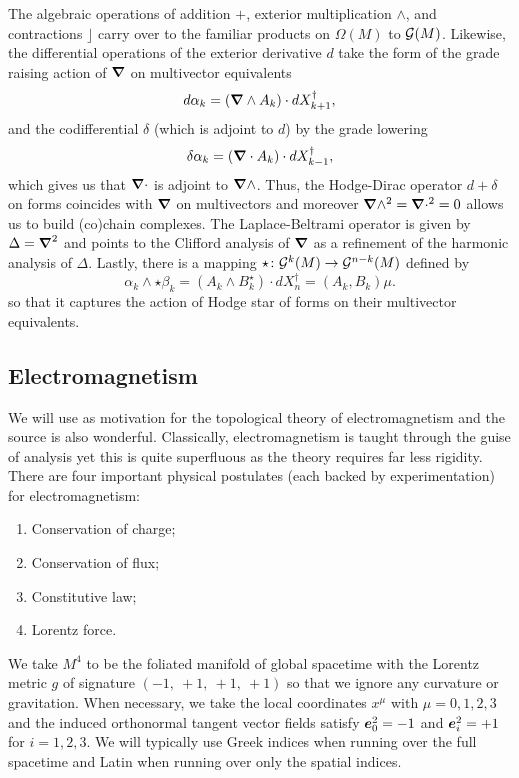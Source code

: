 \documentclass{article}
\begin{document}
The algebraic operations of addition $+$, exterior multiplication $\wedge$, and contractions $\rfloor$ carry over to the familiar products on $\Omega(M)$ to $\mathcal{G}(M)$. Likewise, the differential operations of the exterior derivative $d$ take the form of the grade raising action of $\boldsymbol{\nabla}$ on multivector equivalents
\begin{equation}
d \alpha_k = (\boldsymbol{\nabla} \wedge A_k) \cdot dX_{k+1}^\dagger,
\end{equation}
and the codifferential $\delta$ (which is adjoint to $d$) by the grade lowering
\begin{equation}
\delta \alpha_k = (\boldsymbol{\nabla} \cdot A_k)\cdot dX_{k-1}^\dagger,
\end{equation} 
which gives us that $\boldsymbol{\nabla} \cdot$ is adjoint to $\boldsymbol{\nabla} \wedge$. Thus, the Hodge-Dirac operator $d+\delta$ on forms coincides with $\boldsymbol{\nabla}$ on multivectors and moreover $\boldsymbol{\nabla} \wedge^2 = \boldsymbol{\nabla} \cdot^2=0$ allows us to build (co)chain complexes. The Laplace-Beltrami operator is given by $\Delta = \boldsymbol{\nabla}^2$ and points to the Clifford analysis of $\boldsymbol{\nabla}$ as a refinement of the harmonic analysis of $\Delta$. Lastly, there is a mapping $\star \colon \mathcal{G}^k(M)\to \mathcal{G}^{n-k}(M)$ defined by
\begin{equation}
\alpha_k \wedge \star \beta_k = (A_k \wedge B_k^{\star})\cdot dX_n^\dagger = (A_k,B_k) \mu.
\end{equation}
so that it captures the action of Hodge star of forms on their multivector equivalents. 


\subsection{Electromagnetism}

We will use \cite{hehl_introduction_2003} as motivation for the topological theory of electromagnetism and the source \cite{gross_electromagnetic_2004} is also wonderful. Classically, electromagnetism is taught through the guise of analysis yet this is quite superfluous as the theory requires far less rigidity. There are four important physical postulates (each backed by experimentation) for electromagnetism:
\begin{enumerate}
    \item Conservation of charge;
    \item Conservation of flux;
    \item Constitutive law;
    \item Lorentz force.
\end{enumerate}
We take $M^4$ to be the foliated manifold of global spacetime with the Lorentz metric $g$ of signature $(-1, ~+1,~+1,~+1)$ so that we ignore any curvature or gravitation. When necessary, we take the local coordinates $x^\mu$ with $\mu=0,1,2,3$ and the induced orthonormal tangent vector fields satisfy $\boldsymbol{e}_0^2 = -1$ and $\boldsymbol{e}_i^2=+1$ for $i=1,2,3$. We will typically use Greek indices when running over the full spacetime and Latin when running over only the spatial indices.
\end{document}
